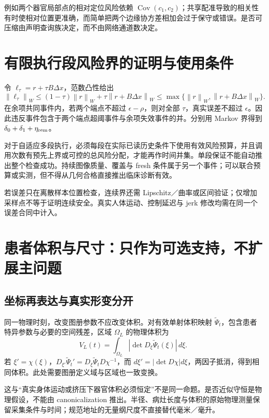 \documentclass[UTF8,fontset=fandol,11pt,a4paper]{ctexart}
\theoremstyle{plain}
\theoremstyle{definition}
\theoremstyle{remark}
\numberwithin{equation}{section}
\newcommand{\norm}[1]{\left\lVert#1\right\rVert}
\DeclareMathOperator{\Cov}{Cov}
\begin{document}
例如两个器官局部点的相对定位风险依赖 $\Cov(c_1,c_2)$；共享配准导致的相关性有时使相对位置更准确，而简单把两个边缘协方差相加会过于保守或错误。是否可压缩由声明查询族决定，而不由网络通道数决定。

\section{有限执行段风险界的证明与使用条件}
\label{app:segment}
令 $\ell_\tau=r+\tau B\Delta x$，范数凸性给出
\begin{equation}
 \norm{\ell_\tau}_W\le(1-\tau)\norm{r}_W+\tau\norm{r+B\Delta x}_W
 \le\max\{\norm r_W,\norm{r+B\Delta x}_W\}.
\end{equation}
在余项共同事件内，若两个端点不超过 $\epsilon-\rho$，则对全部 $\tau$，真实误差不超过 $\epsilon$。因此违反事件包含于两个端点超阈事件与余项失效事件的并。分别用 Markov 界得到 $\delta_0+\delta_1+\eta_{\rm rem}$。

对于自适应多段执行，必须每段在实际已读历史条件下使用有效风险预算，并且调用次数有预先上界或可控的总风险分配，才能再作时间并集。单段保证不能自动推出整个检查成功。持续图像质量、覆盖与 fresh 条件属于另一个事件；可以联合预算或实测，但不得从几何合格直接推出临床诊断有效。

若误差只在离散样本位置检查，连续界还需 Lipschitz／曲率或区间验证；仅增加采样点不等于证明连续安全。真实人体运动、控制延迟与 jerk 修改均需在同一个误差合同中计入。

\section{患者体积与尺寸：只作为可选支持，不扩展主问题}
\label{app:volume}
\subsection{坐标再表达与真实形变分开}
同一物理时刻，改变图册参数不应改变体积。对有效单射体积映射 $\widetilde\Psi_t$，包含患者特异参数与必要的空间残差，区域 $\Omega_L$ 的物理体积为
\begin{equation}
 V_L(t)=\int_{\Omega_L}|\det D_\xi\widetilde\Psi_t(\xi)|\,d\xi.
 \label{eq:volume}
\end{equation}
若 $\xi'=\chi(\xi)$，$D_{\xi'}\widetilde\Psi_t'=D_\xi\widetilde\Psi_tD\chi^{-1}$，而 $d\xi'=|\det D\chi|d\xi$，两因子抵消，得到相同体积。此处需要图册定义域与区域也一致变换。

这与“真实身体运动或挤压下器官体积必须恒定”不是同一命题。是否近似守恒是物理假设，不能由 canonicalization 推出。半径、病灶长度与体积的原始物理测量保留采集条件与时间；规范地址的无量纲尺度不直接替代毫米／毫升。
\end{document}
